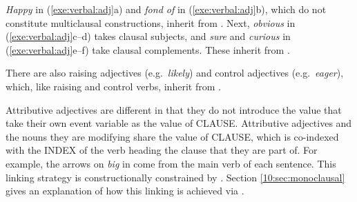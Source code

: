 \noindent \textit{Happy} in (\ref{exe:verbal:adj}a) and \textit{fond
  of} in (\ref{exe:verbal:adj}b), which do not
constitute multiclausal constructions, inherit from
. Next, \textit{obvious} in
(\ref{exe:verbal:adj}c--d) takes clausal subjects, and \textit{sure}
and \textit{curious} in (\ref{exe:verbal:adj}e--f) take clausal
complements. These inherit from .





\noindent There are also raising adjectives (e.g.\ \textit{likely})
and control adjectives (e.g.\ \textit{eager}), which, like raising and
control verbs, inherit from .



Attributive adjectives are different in that they do not introduce the
 value that take their own event variable as the value
of CLAUSE.  Attributive adjectives and the nouns they are modifying
share the value of CLAUSE, which is co-indexed with the
INDEX of the verb heading the clause that they are part of.  For
example, the arrows on \textit{big} in  come
from the main verb of each sentence.  This linking strategy is
constructionally constrained by
. Section \ref{10:sec:monoclausal} gives an explanation
of how this linking is achieved via .










